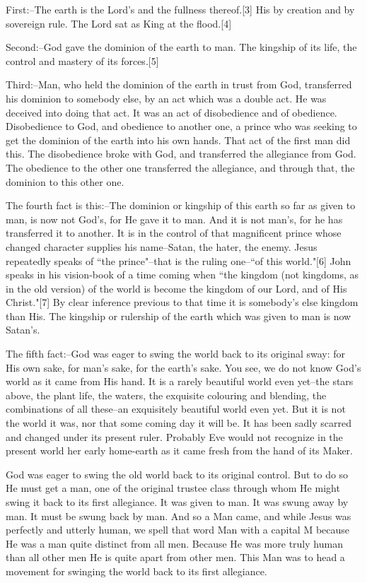 First:--The earth is the Lord's and the fullness thereof.[3] His by
creation and by sovereign rule. The Lord sat as King at the flood.[4]

Second:--God gave the dominion of the earth to man. The kingship of its
life, the control and mastery of its forces.[5]

Third:--Man, who held the dominion of the earth in trust from God,
transferred his dominion to somebody else, by an act which was a double
act. He was deceived into doing that act. It was an act of disobedience
and of obedience. Disobedience to God, and obedience to another one, a
prince who was seeking to get the dominion of the earth into his own
hands. That act of the first man did this. The disobedience broke with
God, and transferred the allegiance from God. The obedience to the other
one transferred the allegiance, and through that, the dominion to this
other one.

The fourth fact is this:--The dominion or kingship of this earth so far
as given to man, is now not God's, for He gave it to man. And it is not
man's, for he has transferred it to another. It is in the control of that
magnificent prince whose changed character supplies his name--Satan, the
hater, the enemy. Jesus repeatedly speaks of ``the prince"--that is the
ruling one--``of this world."[6] John speaks in his vision-book of a time
coming when ``the kingdom (not kingdoms, as in the old version) of the
world is become the kingdom of our Lord, and of His Christ."[7] By clear
inference previous to that time it is somebody's else kingdom than His.
The kingship or rulership of the earth which was given to man is now
Satan's.

The fifth fact:--God was eager to swing the world back to its original
sway: for His own sake, for man's sake, for the earth's sake. You see, we
do not know God's world as it came from His hand. It is a rarely beautiful
world even yet--the stars above, the plant life, the waters, the exquisite
colouring and blending, the combinations of all these--an exquisitely
beautiful world even yet. But it is not the world it was, nor that some
coming day it will be. It has been sadly scarred and changed under its
present ruler. Probably Eve would not recognize in the present world her
early home-earth as it came fresh from the hand of its Maker.

God was eager to swing the old world back to its original control. But to
do so He must get a man, one of the original trustee class through whom He
might swing it back to its first allegiance. It was given to man. It was
swung away by man. It must be swung back by man. And so a Man came, and
while Jesus was perfectly and utterly human, we spell that word Man with a
capital M because He was a man quite distinct from all men. Because He was
more truly human than all other men He is quite apart from other men. This
Man was to head a movement for swinging the world back to its first
allegiance.

